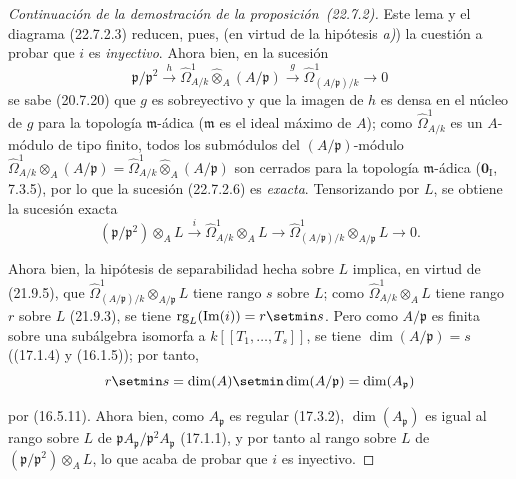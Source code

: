 \begin{proof}[Continuación de la demostración de la proposición~{\rm(22.7.2)}]
Este lema y el diagrama (22.7.2.3) reducen, pues, (en virtud de la hipótesis \emph{a)})
la cuestión a probar que $i$ es \emph{inyectivo}. Ahora bien, en la sucesión
\begin{equation}
\label{0.22.7.2.6-fr}
  \mathfrak p/\mathfrak p^2\xrightarrow{h}
  \widehat\Omega^1_{A/k}\widehat\otimes_A(A/\mathfrak p)
  \xrightarrow{g}\widehat\Omega^1_{(A/\mathfrak p)/k}\longrightarrow0
  \tag{22.7.2.6}
\end{equation}
se sabe (20.7.20) que $g$ es sobreyectivo y que la imagen de $h$ es densa en
el núcleo de $g$ para la topología $\mathfrak m$-ádica ($\mathfrak m$ es
el ideal máximo de $A$); como $\widehat\Omega^1_{A/k}$ es un $A$-módulo de
tipo finito, todos los submódulos del $(A/\mathfrak p)$-módulo
$\widehat\Omega^1_{A/k}\otimes_A(A/\mathfrak p)
=\widehat\Omega^1_{A/k}\widehat\otimes_A(A/\mathfrak p)$
son cerrados para la topología $\mathfrak m$-ádica ($\mathbf{0}_{\mathrm I}$, 7.3.5),
por lo que la sucesión (22.7.2.6) es \emph{exacta}. Tensorizando por $L$, se obtiene la sucesión
exacta
\[
  (\mathfrak p/\mathfrak p^2)\otimes_AL\xrightarrow{i}
  \widehat\Omega^1_{A/k}\otimes_AL\longrightarrow
  \widehat\Omega^1_{(A/\mathfrak p)/k}\otimes_{A/\mathfrak p}L
  \longrightarrow0.
\]

Ahora bien, la hipótesis de separabilidad hecha sobre $L$ implica, en virtud de (21.9.5),
que $\widehat\Omega^1_{(A/\mathfrak p)/k}\otimes_{A/\mathfrak p}L$ tiene
rango $s$ sobre $L$; como $\widehat\Omega^1_{A/k}\otimes_AL$ tiene rango $r$
sobre $L$ (21.9.3), se tiene $\operatorname{rg}_L(\operatorname{Im}(i))=r\setmin s$. Pero como
$A/\mathfrak p$ es finita sobre una subálgebra isomorfa a
$k[[T_1,\ldots,T_s]]$, se tiene $\dim(A/\mathfrak p)=s$ ((17.1.4) y (16.1.5));
por tanto,
\[
  r\setmin s=\dim(A)\setmin\dim(A/\mathfrak p)=\dim(A_{\mathfrak p})
\]


por (16.5.11). Ahora bien, como $A_{\mathfrak p}$ es regular (17.3.2),
$\dim(A_{\mathfrak p})$ es igual al rango sobre $L$ de
$\mathfrak pA_{\mathfrak p}/\mathfrak p^2A_{\mathfrak p}$ (17.1.1), y por tanto al
rango sobre $L$ de $(\mathfrak p/\mathfrak p^2)\otimes_AL$, lo que acaba de
probar que $i$ es inyectivo.
\end{proof}

